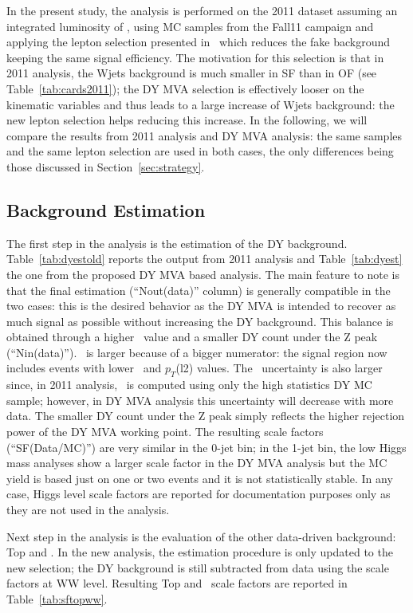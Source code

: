 In the present study, the analysis is performed on the 2011 dataset assuming an integrated luminosity of \intlumi, 
using MC samples from the Fall11 campaign and applying the lepton selection presented in~\cite{ref:silepsel} which 
reduces the fake background keeping the same signal efficiency. 
The motivation for this selection is that in 2011 analysis, the Wjets background is much smaller in SF than in OF (see Table~\ref{tab:cards2011}); 
the DY MVA selection is effectively looser on the kinematic variables and thus leads to a large increase of Wjets background: 
the new lepton selection helps reducing this increase. 
In the following, we will compare the results from 2011 analysis and DY MVA analysis: 
the same samples and the same lepton selection are used in both cases, the only differences being those discussed in Section~\ref{sec:strategy}.

\subsection{Background Estimation}

The first step in the analysis is the estimation of the DY background. 
Table~\ref{tab:dyestold} reports the output from 2011 analysis and Table~\ref{tab:dyest} the one from the proposed DY MVA based analysis.
The main feature to note is that the final estimation (``Nout(data)'' column) is generally compatible in the two cases: 
this is the desired behavior as the DY MVA is intended to recover as much signal as possible without increasing the DY background.
This balance is obtained through a higher \routin\ value and a smaller DY count under the Z peak (``Nin(data)'').
\routin\ is larger because of a bigger numerator: the signal region now includes events with lower \mll\ and $p_T$(l2) values.
The \routin\ uncertainty is also larger since, in 2011 analysis, \routin\ is computed using only the high statistics DY MC sample; 
however, in DY MVA analysis this uncertainty will decrease with more data.
The smaller DY count under the Z peak simply reflects the higher rejection power of the DY MVA working point.
The resulting scale factors (``SF(Data/MC)'') are very similar in the 0-jet bin; 
in the 1-jet bin, the low Higgs mass analyses show a larger scale factor in the DY MVA analysis but the MC yield is based just on one or two 
events and it is not statistically stable. 
In any case, Higgs level scale factors are reported for documentation purposes only as they are not used in the analysis.

Next step in the analysis is the evaluation of the other data-driven background: Top and \W\W. 
In the new analysis, the estimation procedure is only updated to the new selection; the DY background is still subtracted from data using the scale factors at WW level.
Resulting Top and \W\W\ scale factors are reported in Table~\ref{tab:sftopww}.

